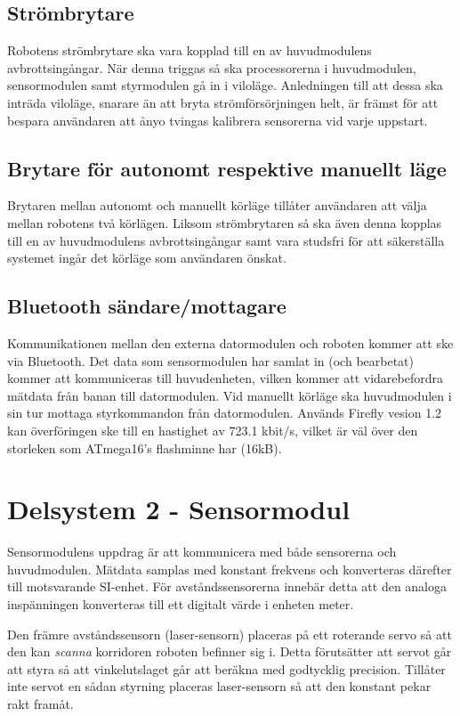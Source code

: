 \documentclass[11pt]{article}
\begin{document}
\begin{flushleft}
\subsection{Strömbrytare}
Robotens strömbrytare ska vara kopplad till en av huvudmodulens avbrottsingångar. När denna triggas så ska processorerna i huvudmodulen, sensormodulen samt styrmodulen gå in i viloläge. Anledningen till att dessa ska inträda viloläge, snarare än att bryta strömförsörjningen helt, är främst för att bespara användaren att ånyo tvingas kalibrera sensorerna vid varje uppstart.
\subsection{Brytare för autonomt respektive manuellt läge}
Brytaren mellan autonomt och manuellt körläge tillåter användaren att välja mellan robotens två körlägen. Liksom strömbrytaren så ska även denna kopplas till en av huvudmodulens avbrottsingångar samt vara studsfri för att säkerställa systemet ingår det körläge som användaren önskat.
\subsection{Bluetooth\textsuperscript{\circledR} sändare/mottagare} \label{bluetooth} 
Kommunikationen mellan den externa datormodulen och roboten kommer att ske via Bluetooth\textsuperscript{\circledR}. Det data som sensormodulen har samlat in (och bearbetat) kommer att kommuniceras till huvudenheten, vilken kommer att vidarebefordra mätdata från banan till datormodulen. Vid manuellt körläge ska huvudmodulen i sin tur mottaga styrkommandon från datormodulen. Används Firefly vesion 1.2 kan överföringen ske till en hastighet av 723.1 kbit/s, vilket är väl över den storleken som ATmega16's flashminne har (16kB).


\pagebreak
\section{Delsystem 2 - Sensormodul}
\label{sec:sensormodul}
Sensormodulens uppdrag är att kommunicera med både sensorerna och huvudmodulen. Mätdata samplas med konstant frekvens och konverteras därefter till motsvarande SI-enhet. För avståndssensorerna innebär detta att den analoga inspänningen konverteras till ett digitalt värde i enheten meter.

Den främre avståndssensorn (laser-sensorn) placeras på ett roterande servo så att den kan \emph{scanna} korridoren roboten befinner sig i. Detta förutsätter att servot går att styra så att vinkelutslaget går att beräkna med godtycklig precision. Tillåter inte servot en sådan styrning placeras laser-sensorn så att den konstant pekar rakt framåt.


\end{flushleft}
\end{document}
